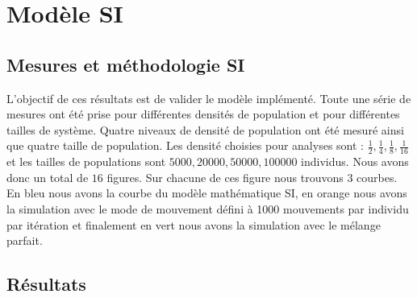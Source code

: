 \chapter{Modèle SI} \label{ch:intro}

\section{Mesures et méthodologie SI}

L'objectif de ces résultats est de valider le modèle implémenté. Toute une série de mesures ont été prise pour différentes densités de population et pour différentes tailles de système. Quatre niveaux de densité de population ont été mesuré ainsi que quatre taille de population. Les densité choisies pour analyses sont : $\frac{1}{2},\frac{1}{4},\frac{1}{8},\frac{1}{16}$ et les tailles de populations sont $5000,20000,50000,100000$ individus. Nous avons donc un total de $16$ figures. Sur chacune de ces figure nous trouvons $3$ courbes. En bleu nous avons la courbe du modèle mathématique SI, en orange nous avons la simulation avec le mode de mouvement défini à 1000 mouvements par individu par itération et finalement en vert nous avons la simulation avec le mélange parfait.

\newpage

\section{Résultats}


